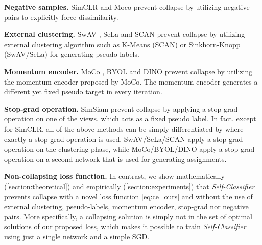 \documentclass[runningheads]{llncs}
\begin{document}
\textbf{Negative samples.} SimCLR \cite{DBLP:journals/corr/abs-2002-05709} and Moco \cite{he2020momentum} prevent collapse by utilizing negative pairs to explicitly force dissimilarity.

\textbf{External clustering.} SwAV \cite{caron2020unsupervised}, SeLa \cite{YM.2020Self-labelling} and SCAN \cite{van2020scan} prevent collapse by utilizing external clustering algorithm such as K-Means (SCAN) or Sinkhorn-Knopp (SwAV/SeLa) for generating pseudo-labels.

\textbf{Momentum encoder.} MoCo \cite{he2020momentum}, BYOL \cite{grill2020bootstrap} and DINO \cite{caron2021emerging} prevent collapse by utilizing the momentum encoder proposed by MoCo. The momentum encoder generates a different yet fixed pseudo target in every iteration.

\textbf{Stop-grad operation.} SimSiam \cite{chen2021exploring} prevent collapse by applying a stop-grad operation on one of the views, which acts as a fixed pseudo label. In fact, except for SimCLR, all of the above methods can be simply differentiated by where exactly a stop-grad operation is used. SwAV/SeLa/SCAN apply a stop-grad operation on the clustering phase, while MoCo/BYOL/DINO apply a stop-grad operation on a second network that is used for generating assignments.

\textbf{Non-collapsing loss function.} In contrast, we show mathematically (\cref{section:theoretical}) and empirically (\cref{section:experiments}) that \textit{Self-Classifier} prevents collapse with a novel loss function \cref{eq:ce_ours} and without the use of external clustering, pseudo-labels, momentum encoder, stop-grad nor negative pairs. More specifically, a collapsing solution is simply not in the set of optimal solutions of our proposed loss, which makes it possible to train \textit{Self-Classifier} using just a single network and a simple SGD.
\end{document}
